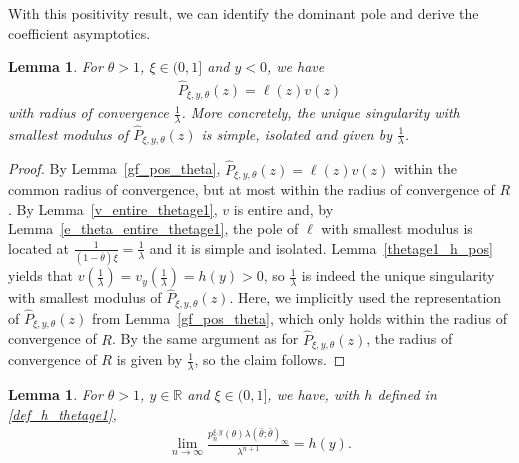 \documentclass[10pt,a4paper]{amsart}
\newcommand{\R}{\mathbb{R}} %
\newcommand{\1}{\mathds{1}}
\newtheorem{Lemma}[definition]{Lemma}
\begin{document}
With this positivity result, we can identify the dominant pole and derive the coefficient asymptotics.
\begin{Lemma}\label{gf_pos_theta_ge1}
     For $\theta>1$, $\xi\in(0,1]$ and $y< 0$, we have
    \begin{align*}
      \hat{P}_{\xi,y,\theta}(z)= \ell(z)v(z)
    \end{align*}
    with radius of convergence $\frac{1}{\lambda}$. More concretely, the unique singularity with smallest modulus of $\hat{P}_{\xi,y,\theta}(z)$ is simple, isolated and given by $\frac{1}{\lambda}$.
\end{Lemma}
\begin{proof}
By Lemma~\ref{gf_pos_theta}, $\hat{P}_{\xi,y,\theta}(z)= \ell(z)v(z)$ within the common radius of convergence, but at most within the radius of convergence of $R$. By Lemma~\ref{v_entire_thetage1}, $v$ is entire and, by Lemma~\ref{e_theta_entire_thetage1}, the pole of $\ell$ with smallest modulus is located at $\frac{1}{(1-\bar\theta)\xi}=\frac{1}{\lambda}$ and it is simple and isolated. Lemma~\ref{thetage1_h_pos} yields that $v\left(\frac{1}{\lambda}\right)=v_y\left(\frac{1}{\lambda}\right)=h(y)>0$, so $\frac{1}{\lambda}$ is indeed the unique singularity with smallest modulus of $\hat{P}_{\xi,y,\theta}(z)$. Here, we implicitly used the representation of $\hat{P}_{\xi,y,\theta}(z)$ from Lemma~\ref{gf_pos_theta}, which only holds within the radius of convergence of $R$. By the same argument as for $\hat{P}_{\xi,y,\theta}(z)$, the radius of convergence of $R$ is given by $\frac{1}{\lambda}$, so the claim follows.
\end{proof}
\begin{Lemma}\label{asymptotic_theta_ge1_neg_y}
  For $\theta>1$, $y\in\R$ and $\xi\in(0,1]$, we have, with $h$ defined in \eqref{def_h_thetage1},
  \begin{align*}
      \lim_{n\to\infty} \frac{p_n^{\xi,y}(\theta)\lambda(\bar\theta;\bar\theta)_\infty}{\lambda^{n+1}}=h(y).
  \end{align*}
\end{Lemma}
\end{document}

